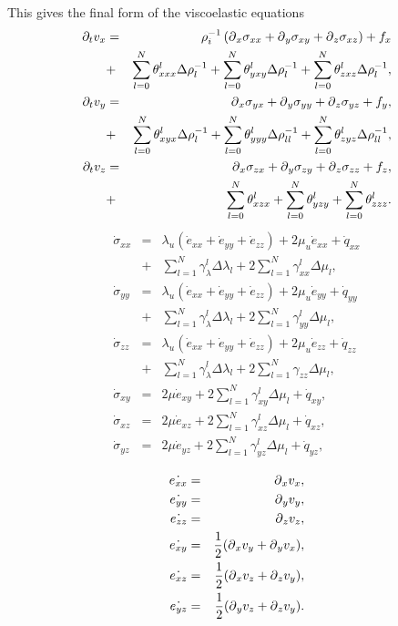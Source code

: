 \documentclass[11pt]{article}
\begin{document}
This gives the final form of the viscoelastic equations
%
\begin{eqnarray}
  \partial_t{v}_x & = & \rho^{-1}_i\left(\mbox{$\partial$}_x \sigma_{xx} +\mbox{$\partial$}_y \sigma_{xy} +\mbox{$\partial$}_z \sigma_{xz}\right) + f_x \\
           & + & \sum_{l=0}^N\theta^l_{xxx}\Delta\rho^{-1}_{l} 
              +  \sum_{l=0}^N\theta^l_{yxy}\Delta\rho^{-1}_{l} 
              +  \sum_{l=0}^N\theta^l_{zxz}\Delta\rho^{-1}_{l}, \\ 
  \partial_t{v}_y & = & \mbox{$\partial$}_x \sigma_{yx} +\mbox{$\partial$}_y \sigma_{yy} +\mbox{$\partial$}_z \sigma_{yz} + f_y, \\
           & + & \sum_{l=0}^N\theta^l_{xyx}\Delta\rho^{-1}_{l} 
             +  \sum_{l=0}^N\theta^l_{yyy}\Delta\rho^{-1}_{ll} 
             +  \sum_{l=0}^N\theta^l_{zyz}\Delta\rho^{-1}_{ll}, \\ 
  \partial_t{v}_z & = & \mbox{$\partial$}_x \sigma_{zx} +\mbox{$\partial$}_y \sigma_{zy} +\mbox{$\partial$}_z \sigma_{zz} + f_z, \\
           & + & \sum_{l=0}^N\theta^l_{xzx} +  \sum_{l=0}^N\theta^l_{yzy} +  \sum_{l=0}^N\theta^l_{zzz}.
\end{eqnarray}
\begin{eqnarray}
  \dot{\sigma}_{xx} & = & \lambda_u \left (\dot{e}_{xx} + \dot{e}_{yy} + \dot{e}_{zz}\right)+ 2\mu_u \dot{e}_{xx} +\dot{q}_{xx} \nonumber\\
              & + & \sum_{l=1}^N\gamma^l_{\lambda}\Delta\lambda_l  + 2\sum_{l=1}^N\gamma^l_{xx}\Delta\mu_l, \\
  \dot{\sigma}_{yy} & = & \lambda_u \left (\dot{e}_{xx} + \dot{e}_{yy} + \dot{e}_{zz}\right)+ 2\mu_u \dot{e}_{yy} +\dot{q}_{yy} \nonumber\\
              & + & \sum_{l=1}^N\gamma^l_{\lambda}\Delta\lambda_l  + 2\sum_{l=1}^N\gamma^l_{yy}\Delta\mu_l, \\
  \dot{\sigma}_{zz} & = & \lambda_u \left (\dot{e}_{xx} + \dot{e}_{yy} + \dot{e}_{zz}\right)+ 2\mu_u \dot{e}_{zz} +\dot{q}_{zz} \nonumber\\
              & + & \sum_{l=1}^N\gamma^l_{\lambda}\Delta\lambda_l  + 2\sum_{l=1}^N\gamma_{zz}\Delta\mu_l\nonumber, \\
  \dot{\sigma}_{xy} & = & 2\mu \dot{e}_{xy} + 2\sum_{l=1}^N\gamma^l_{xy}\Delta\mu_l+\dot{q}_{xy}\nonumber,\\
  \dot{\sigma}_{xz} & = & 2\mu \dot{e}_{xz} + 2\sum_{l=1}^N\gamma^l_{xz}\Delta\mu_l+\dot{q}_{xz}\nonumber,\\
  \dot{\sigma}_{yz} & = & 2\mu \dot{e}_{yz} + 2\sum_{l=1}^N\gamma^l_{yz}\Delta\mu_l+\dot{q}_{yz}\nonumber,\\
                          \label{eq:stress}
\end{eqnarray} 
\begin{eqnarray}
    \dot{e_{xx}} & = & \mbox{$\partial$}_x v_x, \\
    \dot{e_{yy}} & = & \mbox{$\partial$}_y v_y, \\
    \dot{e_{zz}} & = & \mbox{$\partial$}_z v_z, \\
    \dot{e_{xy}} & = & \frac{1}{2}(\mbox{$\partial$}_x v_y + \mbox{$\partial$}_y v_x),\\
    \dot{e_{xz}} & = & \frac{1}{2}(\mbox{$\partial$}_x v_z + \mbox{$\partial$}_z v_y),\\
    \dot{e_{yz}} & = & \frac{1}{2}(\mbox{$\partial$}_y v_z + \mbox{$\partial$}_z v_y).
\end{eqnarray}
\end{document}
